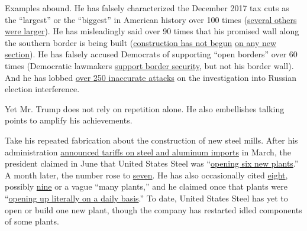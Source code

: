 Examples abound. He has falsely characterized the December 2017 tax cuts
as the ``largest'' or the ``biggest'' in American history over 100 times
(\href{https://www.nytimes.com/2017/11/29/us/politics/fact-check-trump-tax-cuts.html}{several
others were larger}). He has misleadingly said over 90 times that his
promised wall along the southern border is being built
(\href{https://www.nytimes.com/2018/12/11/us/politics/fact-check-trump-border-wall.html}{construction
has not begun}
\href{https://www.nytimes.com/2018/05/11/us/politics/trump-misleadingly-says-construction-has-already-begun-on-his-border-wall.html}{on
any new section}). He has falsely accused Democrats of supporting ``open
borders'' over 60 times (Democratic lawmakers
\href{https://www.nytimes.com/2018/06/27/us/politics/fast-check-donald-trump-democrats-open-borders.html}{support
border security}, but not his border wall). And he has lobbed
\href{https://www.nytimes.com/2018/08/18/us/politics/fact-check-trump-russia-election-interference-.html}{over
250 inaccurate attacks} on the investigation into Russian election
interference.

Yet Mr. Trump does not rely on repetition alone. He also embellishes
talking points to amplify his achievements.

Take his repeated fabrication about the construction of new steel mills.
After his administration
\href{https://www.nytimes.com/2018/03/01/business/trump-tariffs.html}{announced
tariffs on steel and aluminum imports} in March, the president claimed
in June that United States Steel was
``\href{https://www.nytimes.com/2018/06/28/us/politics/fact-check-trump-north-dakota-rally.html}{opening
six new plants}.'' A month later, the number rose to
\href{https://www.whitehouse.gov/briefings-statements/remarks-president-trump-economy/}{seven}.
He has also occasionally cited
\href{https://www.whitehouse.gov/briefings-statements/remarks-president-trump-signing-executive-order-strengthening-retirement-security-america/}{eight},
possibly
\href{https://www.whitehouse.gov/briefings-statements/remarks-president-trump-united-states-mexico-canada-agreement/}{nine}
or a vague ``many plants,'' and he claimed once that plants were
``\href{https://www.whitehouse.gov/briefings-statements/remarks-president-trump-dinner-business-leaders/}{opening
up literally on a daily basis}.'' To date, United States Steel has yet
to open or build one new plant, though the company has restarted idled
components of some plants.

